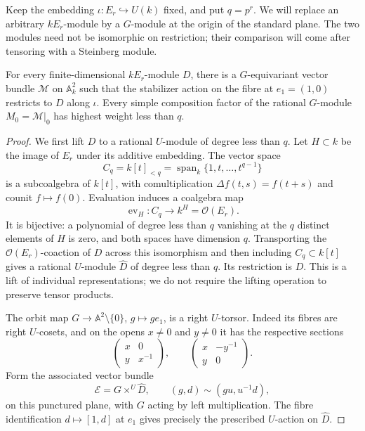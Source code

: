 Keep the embedding $\iota:E_r\hookrightarrow U(k)$ fixed, and put $q=p^r$. We will replace an arbitrary
$kE_r$-module by a $G$-module at the origin of the standard plane.
The two modules need not be isomorphic on restriction; their comparison
will come after tensoring with a Steinberg module.

\begin{proposition}\label{prop:bounded-origin}
For every finite-dimensional $kE_r$-module $D$, there is a
$G$-equivariant vector bundle $\mathcal M$ on $\mathbb A^2_k$ such that
the stabilizer action on the fibre at $e_1=(1,0)$ restricts to $D$
along $\iota$. Every simple composition factor of the rational
$G$-module $M_0=\mathcal M|_0$ has highest weight less than $q$.
\end{proposition}

\begin{proof}
We first lift $D$ to a rational $U$-module of degree less than $q$.
Let $H\subset k$ be the image of $E_r$ under its additive embedding.
The vector space
\[
 C_q=k[t]_{<q}=\operatorname{span}_k\{1,t,\ldots,t^{q-1}\}
\]
is a subcoalgebra of $k[t]$, with comultiplication
$\Delta f(t,s)=f(t+s)$ and counit $f\mapsto f(0)$.
Evaluation induces a coalgebra map
\[
 \operatorname{ev}_H:C_q\longrightarrow k^H=\mathcal O(E_r).
\]
It is bijective: a polynomial of degree less than $q$ vanishing at
the $q$ distinct elements of $H$ is zero, and both spaces have
dimension $q$. Transporting the $\mathcal O(E_r)$-coaction of $D$
across this isomorphism and then including $C_q\subset k[t]$
gives a rational $U$-module $\widehat D$ of degree less than $q$.
Its restriction is $D$. This is a lift of individual representations;
we do not require the lifting operation to preserve tensor products.

The orbit map $G\to\mathbb A^2\setminus\{0\}$, $g\mapsto ge_1$,
is a right $U$-torsor. Indeed its fibres are right $U$-cosets,
and on the opens $x\ne0$ and $y\ne0$ it has the respective sections
\[
 \begin{pmatrix}x&0\\y&x^{-1}\end{pmatrix},\qquad
 \begin{pmatrix}x&-y^{-1}\\y&0\end{pmatrix}.
\]
Form the associated vector bundle
\[
 \mathcal E=G\times^U\widehat D,
 \qquad (g,d)\sim(gu,u^{-1}d),
\]
on this punctured plane, with $G$ acting by left multiplication.
The fibre identification $d\mapsto[1,d]$ at $e_1$ gives precisely
the prescribed $U$-action on $\widehat D$.


\end{proof}
